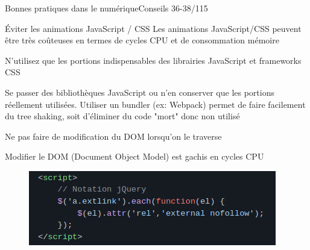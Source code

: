 \begin{frame}{Bonnes pratiques dans le numérique}{Conseils 36-38/115}
\begin{block}{Éviter les animations JavaScript / CSS}
Les animations JavaScript/CSS peuvent être très coûteuses en termes de cycles CPU et de consommation mémoire
\end{block}

\begin{block}{N'utilisez que les portions indispensables des librairies JavaScript et frameworks CSS}

Se passer des bibliothèques JavaScript ou n’en conserver que les portions réellement utilisées.
Utiliser un bundler (ex: Webpack) permet de faire facilement du tree shaking, soit d'éliminer du code "mort" donc non utilisé
\end{block}

\begin{block}{Ne pas faire de modification du DOM lorsqu’on le traverse}

\begin{minipage}[b]{0.35\linewidth}
Modifier le DOM (Document Object Model) est gachis en cycles CPU
\end{minipage}\hfill
\begin{minipage}[b]{0.65\linewidth}
\begin{figure}
    \includegraphics[scale=0.4]{chapitre2/wdd4/fig/c2.png}
\end{figure}
\end{minipage}\hfill
\end{block}
\end{frame}


